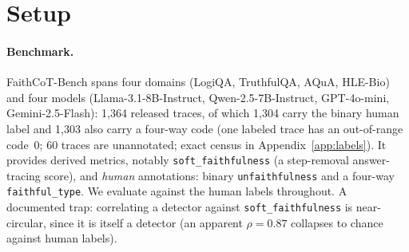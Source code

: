 \documentclass[11pt]{article}
\begin{document}
\section{Setup}
\label{sec:setup}

\paragraph{Benchmark.} FaithCoT-Bench spans four domains (LogiQA, TruthfulQA, AQuA, HLE-Bio) and four models (Llama-3.1-8B-Instruct, Qwen-2.5-7B-Instruct, GPT-4o-mini, Gemini-2.5-Flash): 1{,}364 released traces, of which 1{,}304 carry the binary human label and 1{,}303 also carry a four-way code (one labeled trace has an out-of-range code~0; 60 traces are unannotated; exact census in Appendix~\ref{app:labels}). It provides derived metrics, notably \texttt{soft\_faithfulness} (a step-removal answer-tracing score), and \emph{human} annotations: binary \texttt{unfaithfulness} and a four-way \texttt{faithful\_type}. We evaluate against the human labels throughout. A documented trap: correlating a detector against \texttt{soft\_faithfulness} is near-circular, since it is itself a detector (an apparent $\rho{=}0.87$ collapses to chance against human labels).
\end{document}
